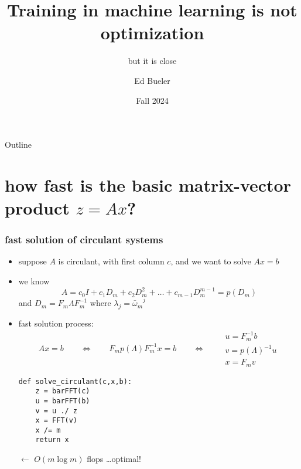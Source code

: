 \documentclass[10pt,
               svgnames,
               hyperref={colorlinks,citecolor=DeepPink4,linkcolor=FireBrick,urlcolor=Maroon},
               usepdftitle=false]{beamer}
\title{Training in machine learning is not optimization}
\subtitle{but it is close}
\author{Ed Bueler}
\institute[]{UAF Math 661 Optimization}
\date{Fall 2024}
\begin{document}
\beamertemplatenavigationsymbolsempty

\begin{frame}
  \maketitle
\end{frame}

\begin{frame}{Outline}
  \tableofcontents[hideallsubsections]
\end{frame}

\section{how fast is the basic matrix-vector product $z=Ax$?}


\begin{frame}[fragile]
\frametitle{fast solution of circulant systems}

\begin{itemize}
\item suppose $A$ is circulant, with first column $c$, and we want to solve $Ax=b$
\item we know
  $$A = c_0 I + c_1 D_m + c_2 D_m^2 + \dots + c_{m-1} D_m^{m-1} = p(D_m)$$
and $D_m = F_m \Lambda F_m^{-1}$ where $\lambda_j = {\bar\omega_m}^j$
\item fast solution process:
    $$Ax = b \qquad \iff \qquad F_m p(\Lambda) F_m^{-1} x = b \qquad \iff \qquad \begin{matrix} u = F_m^{-1} b \\ v = p(\Lambda)^{-1} u \\ x = F_m v \end{matrix}$$ 

\begin{verbatim}
def solve_circulant(c,x,b):
    z = barFFT(c)
    u = barFFT(b)
    v = u ./ z
    x = FFT(v)
    x /= m
    return x
\end{verbatim}

\vspace{-20mm}
\hfill $\gets$ \quad $O(m\log m)$ flops \dots optimal!

\vspace{15mm}
\end{itemize}
\end{frame}
\end{document}
